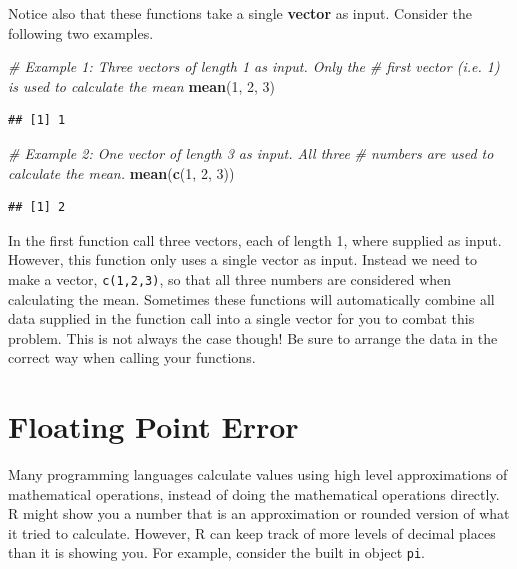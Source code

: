 \documentclass[
]{book}
\newenvironment{Shaded}{\begin{snugshade}}{\end{snugshade}}
\newcommand{\CommentTok}[1]{\textcolor[rgb]{0.56,0.35,0.01}{\textit{#1}}}
\newcommand{\DecValTok}[1]{\textcolor[rgb]{0.00,0.00,0.81}{#1}}
\newcommand{\KeywordTok}[1]{\textcolor[rgb]{0.13,0.29,0.53}{\textbf{#1}}}
\newcommand{\NormalTok}[1]{#1}
\begin{document}
Notice also that these functions take a single \textbf{vector} as input. Consider the following two examples.

\begin{Shaded}
\begin{Highlighting}[]
\CommentTok{# Example 1: Three vectors of length 1 as input.  Only the}
\CommentTok{# first vector (i.e. 1) is used to calculate the mean}
\KeywordTok{mean}\NormalTok{(}\DecValTok{1}\NormalTok{, }\DecValTok{2}\NormalTok{, }\DecValTok{3}\NormalTok{)}
\end{Highlighting}
\end{Shaded}

\begin{verbatim}
## [1] 1
\end{verbatim}

\begin{Shaded}
\begin{Highlighting}[]
\CommentTok{# Example 2: One vector of length 3 as input.  All three}
\CommentTok{# numbers are used to calculate the mean.}
\KeywordTok{mean}\NormalTok{(}\KeywordTok{c}\NormalTok{(}\DecValTok{1}\NormalTok{, }\DecValTok{2}\NormalTok{, }\DecValTok{3}\NormalTok{))}
\end{Highlighting}
\end{Shaded}

\begin{verbatim}
## [1] 2
\end{verbatim}

In the first function call three vectors, each of length 1, where supplied as input. However, this function only uses a single vector as input. Instead we need to make a vector, \texttt{c(1,2,3)}, so that all three numbers are considered when calculating the mean. Sometimes these functions will automatically combine all data supplied in the function call into a single vector for you to combat this problem. This is not always the case though! Be sure to arrange the data in the correct way when calling your functions.

\hypertarget{floating-point-error}{%
\section{Floating Point Error}\label{floating-point-error}}

Many programming languages calculate values using high level approximations of mathematical operations, instead of doing the mathematical operations directly. R might show you a number that is an approximation or rounded version of what it tried to calculate. However, R can keep track of more levels of decimal places than it is showing you. For example, consider the built in object \texttt{pi}.
\end{document}
